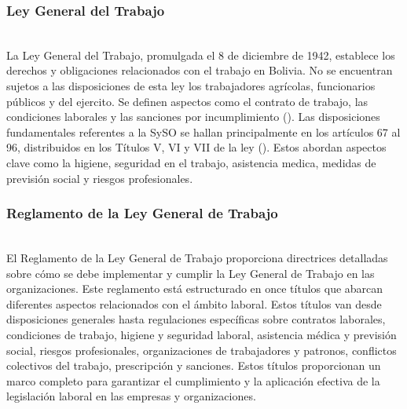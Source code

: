 \subsubsection{Ley General del Trabajo}\hfill\\
\indent
La Ley General del Trabajo, promulgada el 8 de diciembre de 1942, establece los derechos y obligaciones relacionados con el trabajo en Bolivia. No se encuentran sujetos a las disposiciones de esta ley los trabajadores agrícolas, funcionarios públicos y del ejercito.
Se definen aspectos como el contrato de trabajo, las condiciones laborales y las sanciones por incumplimiento (\cite{compendioLeyGeneralDelTrabajo}). Las disposiciones fundamentales referentes a la SySO se hallan principalmente en los artículos 67 al 96, distribuidos en los Títulos V, VI y VII de la ley (\cite{cahuasiquitadiseno}). Estos abordan aspectos clave como la higiene, seguridad en el trabajo, asistencia medica, medidas de previsión social y riesgos profesionales.

\subsubsection{Reglamento de la Ley General de Trabajo}\hfill\\
\indent
El Reglamento de la Ley General de Trabajo proporciona directrices detalladas sobre cómo se debe implementar y cumplir la Ley General de Trabajo en las organizaciones. Este reglamento está estructurado en once títulos que abarcan diferentes aspectos relacionados con el ámbito laboral. Estos títulos van desde disposiciones generales hasta regulaciones específicas sobre contratos laborales, condiciones de trabajo, higiene y seguridad laboral, asistencia médica y previsión social, riesgos profesionales, organizaciones de trabajadores y patronos, conflictos colectivos del trabajo, prescripción y sanciones. Estos títulos proporcionan un marco completo para garantizar el cumplimiento y la aplicación efectiva de la legislación laboral en las empresas y organizaciones.

